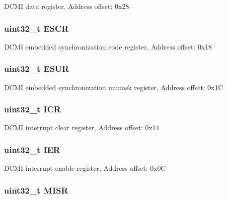 D\-C\-M\-I data register, Address offset\-: 0x28 \hypertarget{struct_d_c_m_i___type_def_a9cc4ec74be864c929261e0810f2fd7f0}{
\subsubsection[{E\-S\-C\-R}]{ uint32\-\_\-t E\-S\-C\-R}}\label{struct_d_c_m_i___type_def_a9cc4ec74be864c929261e0810f2fd7f0}
D\-C\-M\-I embedded synchronization code register, Address offset\-: 0x18 \hypertarget{struct_d_c_m_i___type_def_af751d49ef824c1636c78822ecae066f4}{
\subsubsection[{E\-S\-U\-R}]{ uint32\-\_\-t E\-S\-U\-R}}\label{struct_d_c_m_i___type_def_af751d49ef824c1636c78822ecae066f4}
D\-C\-M\-I embedded synchronization unmask register, Address offset\-: 0x1\-C \hypertarget{struct_d_c_m_i___type_def_a0a8c8230846fd8ff154b9fde8dfa0399}{
\subsubsection[{I\-C\-R}]{ uint32\-\_\-t I\-C\-R}}\label{struct_d_c_m_i___type_def_a0a8c8230846fd8ff154b9fde8dfa0399}
D\-C\-M\-I interrupt clear register, Address offset\-: 0x14 \hypertarget{struct_d_c_m_i___type_def_a6566f8cfbd1d8aa7e8db046aa35e77db}{
\subsubsection[{I\-E\-R}]{ uint32\-\_\-t I\-E\-R}}\label{struct_d_c_m_i___type_def_a6566f8cfbd1d8aa7e8db046aa35e77db}
D\-C\-M\-I interrupt enable register, Address offset\-: 0x0\-C \hypertarget{struct_d_c_m_i___type_def_a524e134cec519206cb41d0545e382978}{
\subsubsection[{M\-I\-S\-R}]{ uint32\-\_\-t M\-I\-S\-R}}\label{struct_d_c_m_i___type_def_a524e134cec519206cb41d0545e382978}
